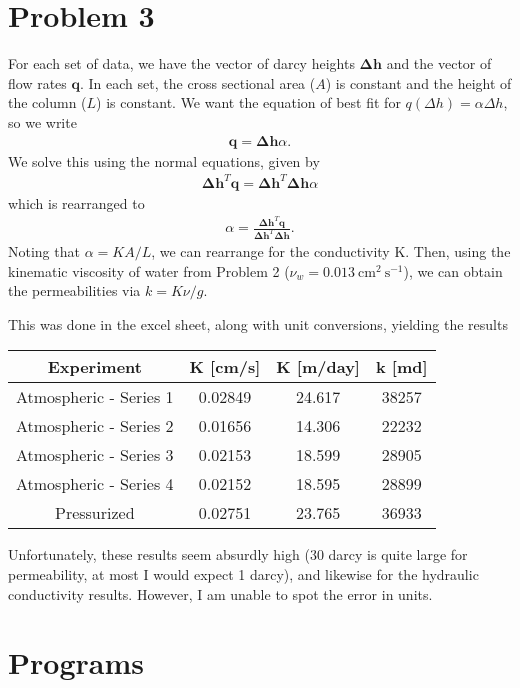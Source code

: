 \documentclass{article}
\begin{document}
\section{Problem 3}
For each set of data, we have the vector of darcy heights $\mathbf{\Delta h}$ and the vector of flow rates $\mathbf{q}$.
In each set, the cross sectional area ($A$) is constant and the height of the column ($L$) is constant.
We want the equation of best fit for $q(\Delta h) = \alpha \Delta h$, so we write
\begin{align}
    \mathbf{q} = \mathbf{\Delta h} \alpha.
\end{align}
We solve this using the normal equations, given by
\begin{align}
    \mathbf{\Delta h}^T \mathbf{q} = \mathbf{\Delta h}^T \mathbf{\Delta h} \alpha
\end{align}
which is rearranged to
\begin{align}
   \alpha = \frac{\mathbf{\Delta h}^T \mathbf{q}}{\mathbf{\Delta h}^T \mathbf{\Delta h}}.
\end{align}
Noting that $\alpha = KA/L$, we can rearrange for the conductivity K.
Then, using the kinematic viscosity of water from Problem 2 ($\nu_{w} = 0.013\mathrm{\ cm}^2 \mathrm{\ s}^{-1}$), we can obtain the permeabilities via $k = K\nu/g$.

This was done in the excel sheet, along with unit conversions, yielding the results
\begin{table}[!h]
\centering
\begin{tabular}{c | c c c}
Experiment & K [cm/s] & K [m/day] & k [md] \\
\hline
Atmospheric - Series 1 & 0.02849 & 24.617 & 38257 \\
Atmospheric - Series 2 & 0.01656 & 14.306 & 22232 \\
Atmospheric - Series 3 & 0.02153 & 18.599 & 28905 \\
Atmospheric - Series 4 & 0.02152 & 18.595 & 28899 \\
Pressurized & 0.02751 & 23.765 & 36933
\end{tabular}
\end{table}

Unfortunately, these results seem absurdly high (30 darcy is quite large for permeability, at most I would expect 1 darcy), and likewise for the hydraulic conductivity results.
However, I am unable to spot the error in units.

\appendix
\section{Programs}



\end{document}
